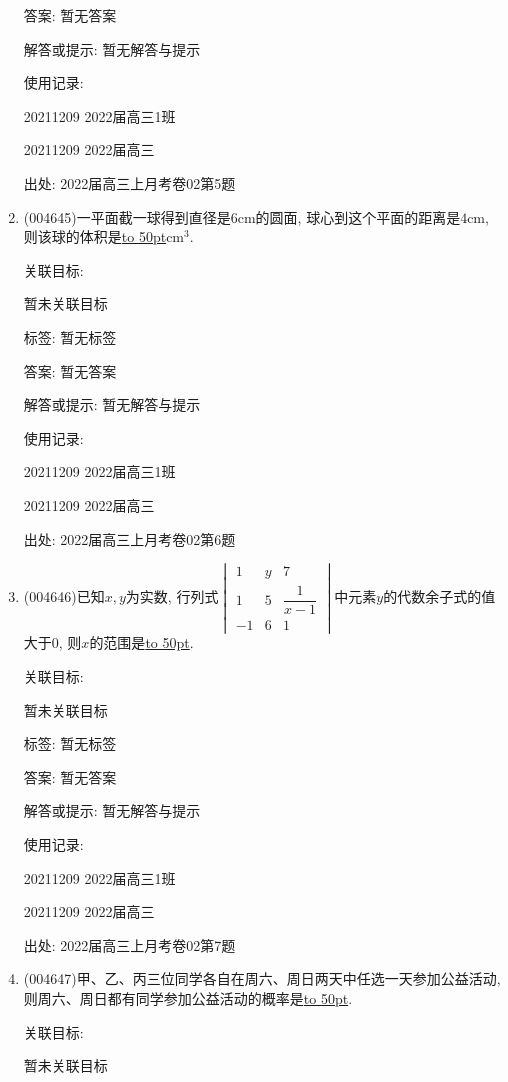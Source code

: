 \documentclass[10pt,a4paper]{article}
\newcommand{\blank}[1]{\underline{\hbox to #1pt{}}}
\begin{document}
\begin{enumerate}[1.]
答案: 暂无答案

解答或提示: 暂无解答与提示

使用记录:

20211209	2022届高三1班	

20211209	2022届高三	


出处: 2022届高三上月考卷02第5题
\item { (004645)}一平面截一球得到直径是$6\text{cm}$的圆面, 球心到这个平面的距离是$4\text{cm}$, 则该球的体积是\blank{50}$\text{cm}^3$.


关联目标:

暂未关联目标



标签: 暂无标签

答案: 暂无答案

解答或提示: 暂无解答与提示

使用记录:

20211209	2022届高三1班	

20211209	2022届高三	


出处: 2022届高三上月考卷02第6题
\item { (004646)}已知$x,y$为实数, 行列式$\begin{vmatrix}
1 & y & 7  \\1 & 5 & \dfrac 1{x-1}  \\-1 & 6 & 1  \end{vmatrix}$中元素$y$的代数余子式的值大于$0$, 则$x$的范围是\blank{50}.


关联目标:

暂未关联目标



标签: 暂无标签

答案: 暂无答案

解答或提示: 暂无解答与提示

使用记录:

20211209	2022届高三1班	

20211209	2022届高三	


出处: 2022届高三上月考卷02第7题
\item { (004647)}甲、乙、丙三位同学各自在周六、周日两天中任选一天参加公益活动, 则周六、周日都有同学参加公益活动的概率是\blank{50}.


关联目标:

暂未关联目标




\end{enumerate}
\end{document}
